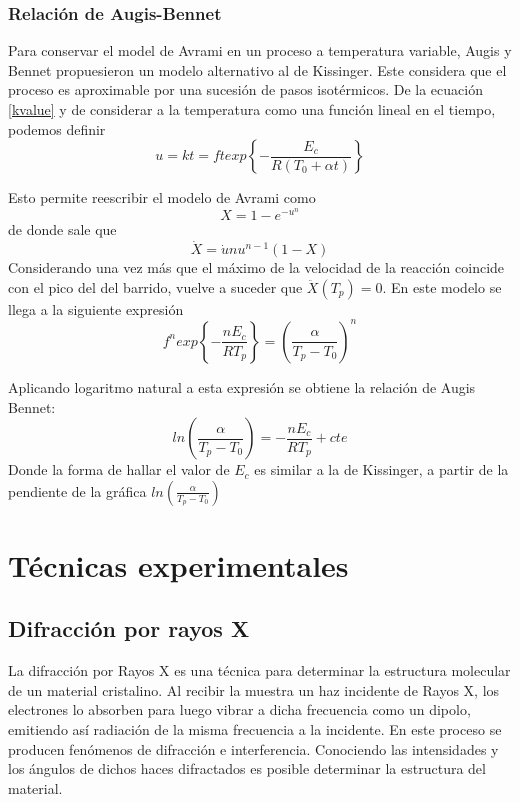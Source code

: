 \documentclass{article}
\theoremstyle{definition}
\theoremstyle{remark}
\begin{document}
\subsubsection{Relación de Augis-Bennet}
Para conservar el model de Avrami en un proceso a temperatura variable, Augis y Bennet propuesieron un modelo alternativo al de Kissinger. Este considera que el proceso es aproximable por una sucesión de pasos isotérmicos.
De la ecuación \ref{kvalue} y de considerar a la temperatura como una función lineal en el tiempo, podemos definir
\begin{equation}
	u = kt = ft exp \left\lbrace -\frac{E_c}{R(T_0 + \alpha t)} \right\rbrace
\end{equation}

Esto permite reescribir el modelo de Avrami como 
\begin{equation}
	X = 1-e^{-u^{n}}
\end{equation}
de donde sale que
\begin{equation}
	\dot{X} = \dot{u}nu^{n-1}(1-X)
\end{equation}
Considerando una vez más que el máximo de la velocidad de la reacción coincide con el pico del del barrido, vuelve a suceder que $\ddot{X}(T_p) = 0$. En este modelo se llega a la siguiente expresión
\begin{equation}
	f^n exp \left\lbrace -\frac{n E_c}{RT_p} \right\rbrace = (\frac{\alpha}{T_p - T_0})^n
\end{equation}

Aplicando logaritmo natural a esta expresión se obtiene la relación de Augis Bennet:
\begin{equation}
	ln(\frac{\alpha}{T_p - T_0}) = -\frac{n E_c}{RT_p} + cte
\end{equation}
Donde la forma de hallar el valor de $E_c$ es similar a la de Kissinger, a partir de la pendiente de la gráfica $ln(\frac{\alpha}{T_p - T_0})$

\section{Técnicas experimentales}

\subsection{Difracción por rayos X}
 La difracción por Rayos X es una técnica para determinar la estructura molecular de un material cristalino. Al recibir la muestra un haz incidente de Rayos X, los electrones lo absorben para luego vibrar a dicha frecuencia como un dipolo, emitiendo así radiación de la misma frecuencia a la incidente. En este proceso se producen fenómenos de difracción e interferencia.  Conociendo las intensidades y los ángulos de dichos haces difractados es posible determinar la estructura del material.
 
\end{document}
